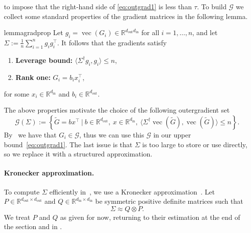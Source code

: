 \documentclass[11pt]{article}
\renewcommand{\vec}{\operatorname{vec}}
\newcommand{\R}{\mathbb{R}}
\newcommand{\ip}[1]{\langle #1 \rangle}
\theoremstyle{plain}
\theoremstyle{definition}
\theoremstyle{remark}
\theoremstyle{definition}
\begin{document}
to impose  that the right-hand side of \eqref{eq:outgrad1} 
is less than $\tau$. 
To build $\mathcal{G}$ we collect some standard properties of the gradient matrices in the following lemma.
\begin{restatable}{lemma}{gradprop} 
  \label{lem:gradprop}
    Let $g_i=\vec(G_i) \in \R^{d_{\mathrm{out}} d_{\mathrm{in}}}$ for all $i=1, \ldots, n$,
    and let $\Sigma := \frac{1}{n} \sum_{i=1}^n g_i g_i^\top$. It follows that the gradients satisfy
    \begin{enumerate}
        \item {\bf Leverage bound:} $ \ip{\Sigma^\dagger g_i, g_i} \leq n$, \\[-0.5cm]
        \item {\bf Rank one:} $G_i = b_i x_i^\top$,
        \end{enumerate}
    for some $x_i \in \R^{d_{\mathrm{in}}}$ and $b_i \in \R^{d_{\mathrm{out}}}$.
\end{restatable}

\noindent The above properties motivate the choice of the following outergradient set
\begin{equation} 
\label{eq:outgrad} 
\mathcal{G}(\Sigma) := \left \{ \widetilde{G} = b x^\top ~\bigg |~  
b\in\mathbb{R}^{d_{\mathrm{out}}},
    \ x\in\mathbb{R}^{d_{\mathrm{in}}}, \
\ip{\Sigma^\dagger \vec(\widetilde{G}), \vec(\widetilde{G})} \leq n \right \}.
\end{equation}
By~ we have that $G_i \in \mathcal{G}$, thus we can use this $\mathcal{G}$ in our upper bound~\eqref{eq:outgrad1}.
The last issue is that $\Sigma$ is too large to store or use directly, so we replace it with a structured approximation.

\paragraph{Kronecker approximation.}
To compute $\Sigma$ efficiently in~, we use a Kronecker approximation~\cite{shampoo,kfac}. Let $P\in \R^{d_{\mathrm{out}} \times d_{\mathrm{out}}}$ and $Q \in\R^{d_{\mathrm{in}} \times d_{\mathrm{in}}}$ be symmetric positive definite matrices such that
\begin{equation} \label{eq:pq-factor} 
     \Sigma  \approx Q \otimes P.
\end{equation}
We treat $P$ and $Q$ as given for now, returning to their estimation at
the end of the section and in \Cref{sec:weighted-estimation}.
\end{document}
